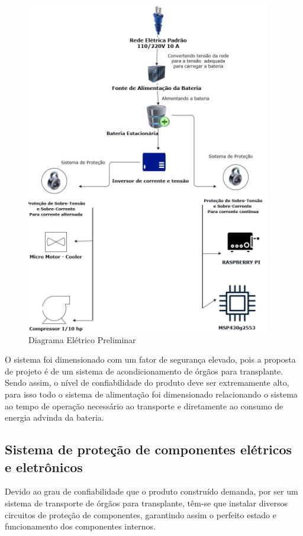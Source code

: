 \begin{figure}[H]
\begin{center}
\includegraphics[scale = 1.2]{figuras/Diagrama_Simp.JPG}
\caption{ Diagrama Elétrico Preliminar}
\end{center}
\end{figure}

O sistema foi dimensionado com um fator de segurança elevado, pois a proposta de projeto é de um sistema de acondicionamento de órgãos para transplante. Sendo assim, o nível de confiabilidade do produto deve ser extremamente alto, para isso todo o sistema de alimentação foi dimensionado relacionando o sistema ao tempo de operação necessário ao transporte e diretamente ao consumo de energia advinda da bateria.

\subsection{Sistema de proteção de componentes elétricos e eletrônicos}
Devido ao grau de confiabilidade que o produto construído demanda, por ser um sistema de transporte de órgãos para transplante, têm-se que instalar diversos circuitos de proteção de componentes, garantindo assim o perfeito estado e funcionamento dos componentes internos.

